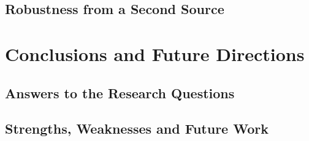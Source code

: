 \documentclass[11pt,a4paper,oneside]{book}
\newif\ifshowdraftnotes
\newcommand{\draftnote}[1]{%
  \ifshowdraftnotes
    \par\smallskip
    \noindent{\color{draftgrey}\small\itshape Drafting note: #1\par}
    \smallskip
  \fi
}
\begin{document}
\section{Robustness from a Second Source}
\label{sec:results-robustness}

\draftnote{One compact section on the non-pooled LSEG regimes: the five-arm sector-33 and midcap-22 nulls, and the temporal-fragility result. The hybrid selected on the opened 2025--2026 window earned net Sharpe 2.271 there and $-0.354$ on an earlier block of the same 33 names; the portable continuous rule was net-negative in both blocks while headline-level scores stayed highly rank-repeatable (Spearman 0.989). Then report the more relevant RQ-A transfer: pinned-FinBERT negative-share conditional coefficients are negative in both LSEG blocks ($-0.02861$ backward; $-0.01573$ recent), but 95\% intervals $[-0.07283,+0.01560]$ and $[-0.09453,+0.06308]$ cross zero after the two-block family. Their 10-bps books lose. Stable or directionally similar measurement does not by itself produce precise portability or a cost-covering signal. Sources: Notebooks 11, 13, 36, 67, 70--72.}

\chapter{Conclusions and Future Directions}
\label{ch:conclusion}

\section{Answers to the Research Questions}
\label{sec:conclusion-answers}

\draftnote{Answer the primary and secondary questions directly with the main estimates and their uncertainty, then state the composite conclusion: in FNSPID development, the distribution beyond the mean carries detectable negative-tail information even after mean sentiment and news count are controlled; the result is not economically usable as a directional signal at realistic costs; the downside-risk evidence is bounded to one FNSPID period; and neither the conditional coefficient nor the exact risk-state rule is established as portable to LSEG.}

\section{Strengths, Weaknesses and Future Work}
\label{sec:conclusion-future}
\end{document}
